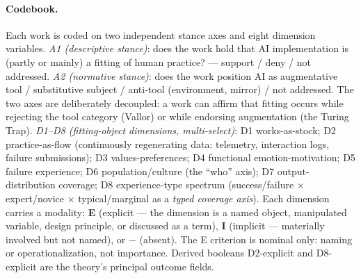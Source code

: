 \documentclass[10pt]{article}
\newcommand{\dminus}{-}
\begin{document}
\paragraph{Codebook.}
Each work is coded on two independent stance axes and eight dimension variables. \emph{A1 (descriptive stance)}: does the work hold that AI implementation is (partly or mainly) a fitting of human practice? --- support / deny / not addressed. \emph{A2 (normative stance)}: does the work position AI as augmentative tool / substitutive subject / anti-tool (environment, mirror) / not addressed. The two axes are deliberately decoupled: a work can affirm that fitting occurs while rejecting the tool category (Vallor) or while endorsing augmentation (the Turing Trap). \emph{D1--D8 (fitting-object dimensions, multi-select)}: D1 works-as-stock; D2 practice-as-flow (continuously regenerating data: telemetry, interaction logs, failure submissions); D3 values-preferences; D4 functional emotion-motivation; D5 failure experience; D6 population/culture (the ``who'' axis); D7 output-distribution coverage; D8 experience-type spectrum (success/failure $\times$ expert/novice $\times$ typical/marginal as a \emph{typed coverage axis}). Each dimension carries a modality: \textbf{E} (explicit --- the dimension is a named object, manipulated variable, design principle, or discussed as a term), \textbf{I} (implicit --- materially involved but not named), or $\dminus$ (absent). The E criterion is nominal only: naming or operationalization, not importance. Derived booleans D2-explicit and D8-explicit are the theory's principal outcome fields.
\end{document}
